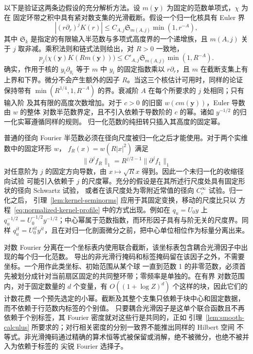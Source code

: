 以下是验证这两条边假设的充分解析方法。设 $m(\boldsymbol y)$ 为固定的范数单项式，$\chi$ 为在
固定环带之积中具有紧对数支集的光滑截断。假设一个归一化核具有 Euler 界
\[
 |(r\partial_r)^jK(r)|\le C_{A,j}\mathfrak S_{m(A,j)}
                                      \min(1,r^{-A}),
\]
其中 $\mathfrak S_k$ 是指定的有限输入半范数与多项式高度界的一个递增族，且 $m(A,j)$ 关于 $j$
取非减。乘积法则和链式法则给出，对 $R>0$ 一致地，
\begin{equation}\label{eq:normalized-kernel-profile}
 p_j\bigl(\chi(\boldsymbol y)K(Rm(\boldsymbol y))\bigr)
 \le C'_{A,j}\mathfrak S_{m(A,j)}\min(1,R^{-A}).
\end{equation}
确实，作用于核的 $y_i\partial_{y_i}$ 等于 $m$ 中 $y_i$ 的固定指数乘以 $r\partial_r$，且
$m$ 在截断支集上有上界和下界。微分不会产生额外的因子 $R$。当这三个核估计可用时，同样的论证
保持带有 $\min(R^{1/4},1,R^{-A})$ 的界。衰减阶 $A$ 在每个所要求的 $j$ 处相同；只有输入阶
及其有限的高度次数增加。对于 $c>0$ 的旧窗 $w(c m(\boldsymbol y))$，Euler 导数由 $w$ 的整体
对数半范数界定，且不引入依赖于导数阶的 $c$ 的幂。诸如 $y^{-1/2}$ 的归一化实幂遵循同样的规则。
归一化范数的纯扭转只插入其高度的固定幂。

普通的径向 Fourier 半范数必须在径向尺度被归一化之后才能使用。对于两个实维数中的固定环形 $w$，
$f_R(x)=w(R|x|^2)$ 满足
\[
 \|\partial^j f_R\|_1=R^{j/2-1}\|\partial^j f_1\|_1
\]
对任意阶为 $j$ 的固定方向导数，由 $x\mapsto\sqrt R x$ 得到。因此一个未归一化的收缩径向试验
可能引入依赖于 $j$ 的尺度幂。充分的假设是在其所述行尺度处具有固定形状的径向 Schwartz 试验，
或者在该尺度处为零附近常值的径向 $C_c^\infty$ 试验。归一化之后，
引理~\ref{lem:kernel-seminorms} 应用于其固定变换，移动的尺度比只以
方程~\eqref{eq:normalized-kernel-profile} 中的方式出现。例如在 $q_u=U_0y$ 上
$q_u^{-1/2}=U_0^{-1/2}y^{-1/2}$；中心幂属于范数指数，而环形因子具有与阶无关的尺度界。同样
$q_u^{it}=U_0^{it}y^{it}$，且在对归一化剖面微分之前，把中心单位相位作为标量分离出来。

对数 Fourier 分离在一个坐标表内使用联合截断，该坐标表包含耦合光滑因子中出现的每个归一化范数。
导出的非光滑行掩码和标签掩码留在该因子之外，不需要坐标。一个用作此类坐标、初始范围从某个球
一直到范数 1 的非零范数，必须首先被划分成针对当前扇区固定的共同整环带；零频率是单独的。在有界
对数范围内，对于固定数量的 $d$ 个变量，有 $O((1+\log Z)^d)$ 个这样的块，因此它们的计数花费
一个预先选定的小幂。截断及其整个支集只依赖于块中心和固定数据，而不依赖于行范数内标签的个别值。
只要耦合光滑因子是这单个联合函数且不再依赖于个别标签，其 Fourier 密度就对这些行是共同的，正如
引理~\ref{lem:smooth-calculus} 所要求的；对行相关密度的分别一致界不能推出同样的 Hilbert 空间
不等式。非光滑掩码通过精确的算术恒等式被保留或消解，绝不被微分，也绝不被并入为依赖于标签的
尖锐 Fourier 选择子。

